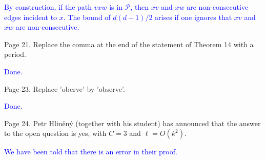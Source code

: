 \documentclass[12pt]{article}
\newcommand{\done}{\textcolor{blue}{Done.}}
\begin{document}
\textcolor{blue}{By construction, if the path $vxw$ is in $\mathcal{P}$, then $xv$ and $xw$ are non-consecutive edges incident to $x$. The bound of $d(d-1)/2$ arises if one ignores that $xv$ and $xw$ are non-consecutive.}


Page 21.  Replace the comma at the end of the statement of Theorem 14
with a period.

\done

Page 23. Replace 'oberve' by 'observe'.

\done

Page 24. Petr Hliněný (together with his student) has announced that
the answer to the open question is yes, with $C=3$ and $\ell=O(k^2)$.

\textcolor{blue}{We have been told that there is an error in their proof.}
\end{document}
